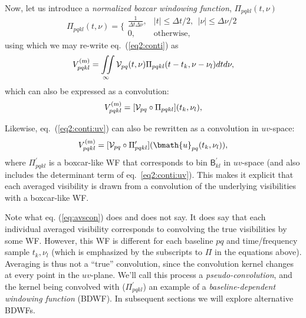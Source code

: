 \documentclass[useAMS,usenatbib]{mn2e}
\begin{document}
Now, let us introduce a \emph{normalized boxcar windowing function}, $\Pi_{pqkl}(t,\nu)$ 
\begin{equation}
\Pi_{pqkl}(t,\nu) = \bigg \{ \begin{array}{cl}
\frac{1}{\Delta t\Delta\nu}, &  |t|\leq\Delta t/2,~~|\nu|\leq\Delta\nu/2 \\
0, & \mathrm{otherwise},
\end{array}
\end{equation}
using which we may re-write eq.~(\ref{eq2:conti}) as
\begin{equation}
V^\mathrm{(m)}_{pqkl} =  
\iint\limits_{\infty}
\mathcal{V}_{pq}(t,\nu) \Pi_{pqkl}(t-t_k,\nu-\nu_l) dtd\nu,
\end{equation}
which can also be expressed as a convolution:
\begin{equation}
V^\mathrm{(m)}_{pqkl} = [ \mathcal{V}_{pq} \circ \Pi_{pqkl} ](t_k,\nu_l),
\end{equation}

Likewise, eq.~(\ref{eq2:conti:uv}) can also be rewritten as a convolution in $uv$-space:
\begin{equation}
V^\mathrm{(m)}_{pqkl} = [ \VV_{pq} \circ \Pi^\prime_{pqkl} ](\bmath{u}_{pq}(t_k,\nu_l)),
\label{eq:avscon}
\end{equation}
where $\Pi^\prime_{pqkl}$ is a boxcar-like WF that corresponds to bin $\mathsf{B}^\prime_{kl}$ in $uv$-space 
(and also includes the determinant term of eq.~\ref{eq2:conti:uv}). This makes it explicit that each averaged 
visibility is drawn from a convolution of the underlying visibilities with a boxcar-like WF.

Note what eq. (\ref{eq:avscon}) does and does not say. It does say that each individual averaged visibility corresponds to 
convolving the true visibilities by some WF. However, this WF is different for each baseline $pq$ and 
time/frequency sample $t_k,\nu_l$ (which is emphasized by the subscripts to $\Pi$ in the equations above). Averaging is thus 
not a ``true'' convolution, since the convolution kernel changes at every point in the $uv$-plane. We'll call this 
process a \emph{pseudo-convolution}, and the kernel being convolved with ($\Pi^\prime_{pqkl}$) an example of a 
\emph{baseline-dependent windowing function} (BDWF). In subsequent sections we will explore alternative BDWFs.
\end{document}
